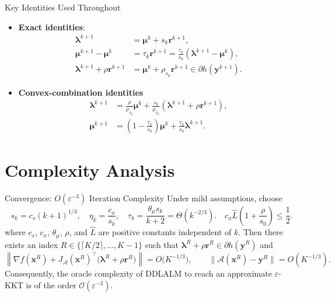 \documentclass[handout,compress,9pt]{beamer}
\newcommand{\blue}[1]{\textcolor{ddlblue}{#1}}
\newcommand{\bx}{\bm{x}}
\newcommand{\by}{\bm{y}}
\newcommand{\br}{\bm{r}}
\newcommand{\bmu}{\bm{\mu}}
\newcommand{\blmbd}{\bm{\lambda}}
\newcommand{\calA}{\mathcal{A}}
\newcommand{\calO}{\mathcal{O}}
\newcommand{\eps}{\varepsilon}
\begin{document}
\begin{frame}{Key Identities Used Throughout}

\begin{itemize}
  \item[\blue{$\triangleright$}]\textbf{Exact identities}:
\begin{equation}\label{eq:key-exact-identities}
\begin{aligned}
  \blmbd^{k+1}
  &=\bmu^k+s_k\br^{k+1},\\
  \bmu^{k+1}-\bmu^k
  &=\tau_k\br^{k+1}
  =\frac{\tau_k}{s_k}(\blmbd^{k+1}-\bmu^k),\\
  \blmbd^{k+1}+\rho\br^{k+1}
  &=\bmu^k+\rho_{s_k}\br^{k+1}
  \in\partial h(\by^{k+1}).
\end{aligned}
\end{equation}

\item[\blue{$\triangleright$}]\textbf{Convex-combination identities}
\begin{equation}\label{eq:key-convex-combinations}
\begin{aligned}
  \blmbd^{k+1}
  &=\frac{\rho}{\rho_{s_k}}\bmu^k
  +\frac{s_k}{\rho_{s_k}}
  (\blmbd^{k+1}+\rho\br^{k+1}),\\
  \bmu^{k+1}
  &=\left(1-\frac{\tau_k}{s_k}\right)\bmu^k+ 
  \frac{\tau_k}{s_k}\blmbd^{k+1}.
\end{aligned}
\end{equation}
\end{itemize}

\end{frame}

\section{Complexity Analysis}

\begin{frame}{Convergence: $O(\eps^{-3})$ Iteration Complexity}
Under mild assumptions, choose
\begin{equation*}
  s_k=c_s(k+1)^{1/3},
  \quad \eta_k=\frac{c_x}{s_k},
  \quad \tau_k=\frac{\theta_\mu s_k}{k+2} = \Theta(k^{-2/3}).
  \quad c_x\widehat L\left(1+\frac{\rho}{s_0}\right)\le \frac12.
\end{equation*}
where $c_s$, $c_x$, $\theta_\mu$, $\rho$, and $\widehat L$ are positive constants independent of $k$.
Then there exists an index
$R\in\{\lceil K/2\rceil,\ldots,K-1\}$ such that
$\blmbd^R+\rho\br^R\in\partial h(\by^R)$ and
\begin{equation*}
  \left\|\nabla f(\bx^R)+J_{\calA}(\bx^R)^\top
  \bigl(\blmbd^R+\rho\br^R\bigr)\right\|
  =O\bigl(K^{-1/3}\bigr),
  \qquad
  \|\calA(\bx^R)-\by^R\|=O(K^{-1/3}).
\end{equation*}
Consequently, the oracle complexity of DDLALM to reach an approximate $\varepsilon$-KKT is of the order $\calO(\varepsilon^{-3})$.
\end{frame}
\end{document}
